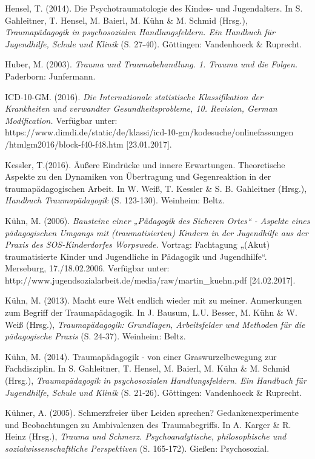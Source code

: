 \hang
Hensel, T. (2014). Die Psychotraumatologie des Kindes- und Jugendalters. In S. Gahleitner, T. Hensel, M. Baierl, M. K{\"u}hn \& M. Schmid (Hrsg.), \textit{Traumap{\"a}dagogik in psychosozialen Handlungsfeldern. Ein Handbuch f{\"u}r Jugendhilfe, Schule und Klinik} (S. 27-40). Göttingen: Vandenhoeck \& Ruprecht.

\hang
Huber, M. (2003). \textit{Trauma und Traumabehandlung. 1. Trauma und die Folgen.} Paderborn: Junfermann.

\hang
ICD-10-GM. (2016). \textit{Die Internationale statistische Klassifikation der Krankheiten und verwandter Gesundheitsprobleme, 10. Revision, German Modification.} Verfügbar unter:\\ https://www.dimdi.de/static/de/klassi/icd-10-gm/kodesuche/onlinefassungen\\
/htmlgm2016/block-f40-f48.htm [23.01.2017].

\hang
Kessler, T.(2016). {\"A}ußere Eindr{\"u}cke und innere Erwartungen. Theoretische Aspekte zu den Dynamiken von {\"U}bertragung und Gegenreaktion in der traumap{\"a}dagogischen Arbeit. In W. Weiß, T. Kessler \& S. B. Gahleitner (Hrsg.), \textit{Handbuch Traumapädagogik} (S. 123-130). Weinheim: Beltz.

\hang
Kühn, M. (2006). \textit{Bausteine einer „P{\"a}dagogik des Sicheren Ortes“ - Aspekte eines p{\"a}dagogischen Umgangs mit (traumatisierten) Kindern in der Jugendhilfe aus der Praxis des SOS-Kinderdorfes Worpswede.} Vortrag: Fachtagung „(Akut) traumatisierte Kinder und Jugendliche in P{\"a}dagogik und Jugendhilfe“. Merseburg, 17./18.02.2006. Verfügbar unter:\\ http://www.jugendsozialarbeit.de/media/raw/martin\_kuehn.pdf [24.02.2017].

\hang
Kühn, M. (2013). Macht eure Welt endlich wieder mit zu meiner. Anmerkungen zum Begriff der Traumapädagogik. In J. Bausum, L.U. Besser, M. Kühn \& W. Weiß (Hrsg.), \textit{Traumapädagogik: Grundlagen, Arbeitsfelder und Methoden für die pädagogische Praxis} (S. 24-37). Weinheim: Beltz.

\hang
Kühn, M. (2014). Traumap{\"a}dagogik - von einer Graswurzelbewegung zur Fachdisziplin. In S. Gahleitner, T. Hensel, M. Baierl, M. K{\"u}hn \& M. Schmid (Hrsg.), \textit{Traumap{\"a}dagogik in psychosozialen Handlungsfeldern. Ein Handbuch f{\"u}r Jugendhilfe, Schule und Klinik} (S. 21-26). Göttingen: Vandenhoeck \& Ruprecht.

\hang
K{\"u}hner, A. (2005). Schmerzfreier {\"u}ber Leiden sprechen? Gedankenexperimente und Beobachtungen zu Ambivalenzen des Traumabegriffs. In A. Karger \& R. Heinz (Hrsg.), \textit{Trauma und Schmerz. Psychoanalytische, philosophische und sozialwissenschaftliche Perspektiven} (S. 165-172). Gießen: Psychosozial.

